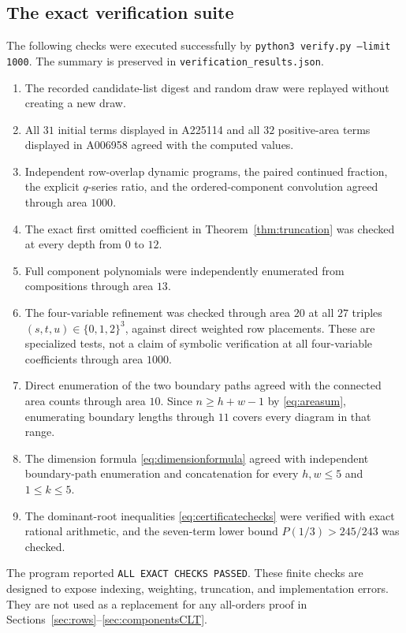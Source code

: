 \documentclass[11pt,letterpaper]{article}
\numberwithin{equation}{section}
\theoremstyle{definition}
\begin{document}
\subsection{The exact verification suite}
The following checks were executed successfully by
\texttt{python3 verify.py --limit 1000}. The summary is preserved in
\texttt{verification\_results.json}.
\begin{enumerate}[leftmargin=1.8em,itemsep=3pt]
\item The recorded candidate-list digest and random draw were replayed
without creating a new draw.
\item All $31$ initial terms displayed in A225114 and all $32$ positive-area
terms displayed in A006958 agreed with the computed values.
\item Independent row-overlap dynamic programs, the paired continued
fraction, the explicit $q$-series ratio, and the ordered-component
convolution agreed through area $1000$.
\item The exact first omitted coefficient in
Theorem~\ref{thm:truncation} was checked at every depth from $0$ to $12$.
\item Full component polynomials were independently enumerated from
compositions through area $13$.
\item The four-variable refinement was checked through area $20$ at all
$27$ triples $(s,t,u)\in\{0,1,2\}^3$, against direct weighted row placements.
These are specialized tests, not a claim of symbolic verification at all
four-variable coefficients through area $1000$.
\item Direct enumeration of the two boundary paths agreed with the
connected area counts through area $10$. Since
$n\ge h+w-1$ by \eqref{eq:areasum}, enumerating boundary lengths through
$11$ covers every diagram in that range.
\item The dimension formula \eqref{eq:dimensionformula} agreed with
independent boundary-path enumeration and concatenation for every
$h,w\le5$ and $1\le k\le5$.
\item The dominant-root inequalities \eqref{eq:certificatechecks} were
verified with exact rational arithmetic, and the seven-term lower bound
$P(1/3)>245/243$ was checked.
\end{enumerate}

The program reported \texttt{ALL EXACT CHECKS PASSED}. These finite checks
are designed to expose indexing, weighting, truncation, and implementation
errors. They are not used as a replacement for any all-orders proof in
Sections~\ref{sec:rows}--\ref{sec:componentsCLT}.
\end{document}
